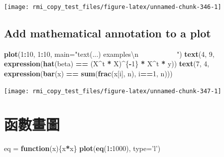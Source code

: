 \documentclass[]{book}
\newenvironment{Shaded}{\begin{snugshade}}{\end{snugshade}}
\newcommand{\CharTok}[1]{\textcolor[rgb]{0.31,0.60,0.02}{#1}}
\newcommand{\ControlFlowTok}[1]{\textcolor[rgb]{0.13,0.29,0.53}{\textbf{#1}}}
\newcommand{\DataTypeTok}[1]{\textcolor[rgb]{0.13,0.29,0.53}{#1}}
\newcommand{\DecValTok}[1]{\textcolor[rgb]{0.00,0.00,0.81}{#1}}
\newcommand{\KeywordTok}[1]{\textcolor[rgb]{0.13,0.29,0.53}{\textbf{#1}}}
\newcommand{\NormalTok}[1]{#1}
\newcommand{\OperatorTok}[1]{\textcolor[rgb]{0.81,0.36,0.00}{\textbf{#1}}}
\newcommand{\StringTok}[1]{\textcolor[rgb]{0.31,0.60,0.02}{#1}}
\theoremstyle{definition}
\theoremstyle{definition}
\theoremstyle{definition}
\theoremstyle{remark}
\begin{document}
\begin{center}\texttt{[image: rmi\_copy\_test\_files/figure-latex/unnamed-chunk-346-1]} \end{center}

\hypertarget{add-mathematical-annotation-to-a-plot}{%
\subsection{Add mathematical annotation to a
plot}\label{add-mathematical-annotation-to-a-plot}}

\begin{Shaded}
\begin{Highlighting}[]
\KeywordTok{plot}\NormalTok{(}\DecValTok{1}\OperatorTok{:}\DecValTok{10}\NormalTok{, }\DecValTok{1}\OperatorTok{:}\DecValTok{10}\NormalTok{, }
     \DataTypeTok{main=}\StringTok{"text(...) examples}\CharTok{\textbackslash{}n}\StringTok{~~~~~~~~~~~"}\NormalTok{)}
\KeywordTok{text}\NormalTok{(}\DecValTok{4}\NormalTok{, }\DecValTok{9}\NormalTok{, }\KeywordTok{expression}\NormalTok{(}\KeywordTok{hat}\NormalTok{(beta) }\OperatorTok{==}\StringTok{ }\NormalTok{(X}\OperatorTok{^}\NormalTok{t }\OperatorTok{*}\StringTok{ }\NormalTok{X)}\OperatorTok{^}\NormalTok{\{}\OperatorTok{-}\DecValTok{1}\NormalTok{\} }\OperatorTok{*}\StringTok{ }\NormalTok{X}\OperatorTok{^}\NormalTok{t }\OperatorTok{*}\StringTok{ }\NormalTok{y))}
\KeywordTok{text}\NormalTok{(}\DecValTok{7}\NormalTok{, }\DecValTok{4}\NormalTok{, }\KeywordTok{expression}\NormalTok{(}\KeywordTok{bar}\NormalTok{(x) }\OperatorTok{==}\StringTok{ }\KeywordTok{sum}\NormalTok{(}\KeywordTok{frac}\NormalTok{(x[i], n), i}\OperatorTok{==}\DecValTok{1}\NormalTok{, n)))}
\end{Highlighting}
\end{Shaded}

\begin{center}\texttt{[image: rmi\_copy\_test\_files/figure-latex/unnamed-chunk-347-1]} \end{center}

\section{函數畫圖}

\begin{Shaded}
\begin{Highlighting}[]
\NormalTok{eq =}\StringTok{ }\ControlFlowTok{function}\NormalTok{(x)\{x}\OperatorTok{*}\NormalTok{x\}}
\KeywordTok{plot}\NormalTok{(}\KeywordTok{eq}\NormalTok{(}\DecValTok{1}\OperatorTok{:}\DecValTok{1000}\NormalTok{), }\DataTypeTok{type=}\StringTok{'l'}\NormalTok{)}
\end{Highlighting}
\end{Shaded}
\end{document}
